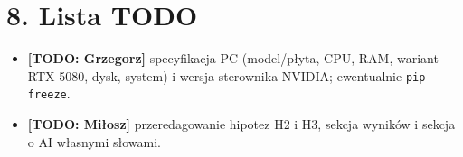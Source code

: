 \documentclass[10pt,a4paper]{article}
\newcommand{\TODO}[1]{{\color{red!75!black}\textbf{[TODO: #1]}}}
\begin{document}
\section*{8. Lista TODO}
\begin{itemize}
  \item \TODO{Grzegorz} specyfikacja PC (model/płyta, CPU, RAM, wariant RTX 5080, dysk, system) i wersja sterownika NVIDIA; ewentualnie \texttt{pip freeze}.
  \item \TODO{Miłosz} przeredagowanie hipotez H2 i H3, sekcja wyników i sekcja o AI własnymi słowami.
\end{itemize}
\end{document}
